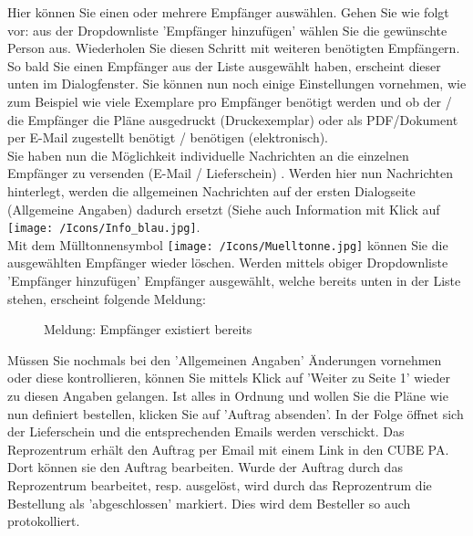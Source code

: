 Hier können Sie einen oder mehrere Empfänger auswählen. Gehen Sie wie folgt vor: aus der Dropdownliste 'Empfänger hinzufügen' wählen Sie die gewünschte Person aus. Wiederholen Sie diesen Schritt mit weiteren benötigten Empfängern. So bald Sie einen Empfänger aus der Liste ausgewählt haben, erscheint dieser unten im Dialogfenster. Sie können nun noch einige Einstellungen vornehmen, wie zum Beispiel wie viele Exemplare pro Empfänger benötigt werden und ob der / die Empfänger die Pläne ausgedruckt (Druckexemplar) oder als PDF/Dokument per E-Mail zugestellt benötigt / benötigen (elektronisch). \\
Sie haben nun die Möglichkeit individuelle Nachrichten an die einzelnen Empfänger zu versenden (E-Mail / Lieferschein) . Werden hier nun Nachrichten hinterlegt, werden die allgemeinen Nachrichten auf der ersten Dialogseite (Allgemeine Angaben) dadurch ersetzt (Siehe auch Information mit Klick auf \texttt{[image: /Icons/Info\_blau.jpg]}. \\
Mit dem Mülltonnensymbol \texttt{[image: /Icons/Muelltonne.jpg]}  können Sie die ausgewählten Empfänger wieder löschen. Werden mittels obiger Dropdownliste 'Empfänger hinzufügen'  Empfänger ausgewählt, welche bereits unten in der Liste stehen, erscheint folgende Meldung:

\begin{figure}[H]
\caption{Meldung: Empfänger existiert bereits}
\end{figure}

\vspace{\baselineskip}

Müssen Sie nochmals bei den 'Allgemeinen Angaben' Änderungen vornehmen oder diese kontrollieren, können Sie mittels Klick auf 'Weiter zu Seite 1' wieder zu diesen Angaben gelangen. Ist alles in Ordnung und wollen Sie die Pläne wie nun definiert bestellen, klicken Sie auf 'Auftrag absenden'. In der Folge öffnet sich der Lieferschein und die entsprechenden Emails werden verschickt. Das Reprozentrum erhält den Auftrag per Email mit einem Link in den CUBE PA. Dort können sie den Auftrag bearbeiten. Wurde der Auftrag durch das Reprozentrum bearbeitet, resp. ausgelöst, wird durch das Reprozentrum die Bestellung als 'abgeschlossen' markiert. Dies wird dem Besteller so auch protokolliert.

